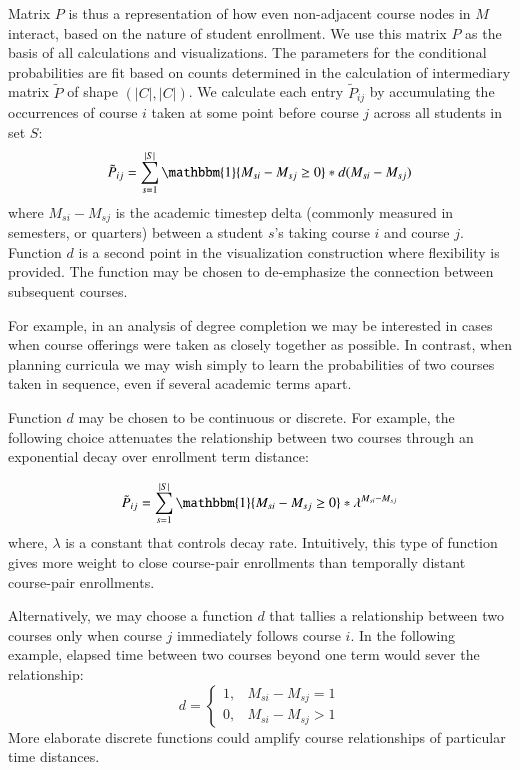 Matrix $P$ is thus a representation of how even non-adjacent course nodes in $M$ interact, based on the nature of student enrollment. We use this matrix $P$ as the basis of all calculations and visualizations. 
 The parameters for the conditional probabilities are fit based on counts determined in the calculation of intermediary matrix $\tilde{P}$ of shape $(|C|, |C|)$. We calculate each entry $\tilde{P}_{ij}$ by accumulating the occurrences of course $i$ taken at some point before course $j$ across all students in set $S$:
\begin{equation}
  \tilde{P}_{ij} = \sum_{s=1}^{|S|} \mathbbm{1}\{M_{si} - M_{sj} \geq 0\}* d(M_{si} - M_{sj})
\end{equation}
where $M_{si} - M_{sj}$ is the academic timestep delta (commonly
measured in semesters, or quarters) between a student $s$'s taking
course $i$ and course $j$. Function $d$ is a second point in the
visualization construction where flexibility is provided. The function
may be chosen to de-emphasize the connection between subsequent
courses.

For example, in an analysis of degree completion we may be interested
in cases when course offerings were taken as closely together as
possible. In contrast, when planning curricula we may wish simply to
learn the probabilities of two courses taken in sequence, even if
several academic terms apart.

Function $d$ may be chosen to be continuous or discrete.  For example,
the following choice attenuates the relationship between two courses
through an exponential decay over enrollment term distance:

\begin{equation}
  \tilde{P}_{ij} = \sum_{s=1}^{|S|} \mathbbm{1}\{M_{si} - M_{sj} \geq 0\}* \lambda^{M_{si} - M_{sj}}
\end{equation}
where, $\lambda$ is a constant that controls decay rate. Intuitively, this type of function gives more weight to close course-pair enrollments than temporally distant course-pair enrollments.

Alternatively, we may choose a function $d$ that tallies a
relationship between two courses only when course $j$ immediately
follows course $i$. In the following example, elapsed time between two
courses beyond one term would sever the relationship:
\begin{equation}
d = \begin{cases} 
      1, & M_{si} - M_{sj} = 1 \\
      0, & M_{si} - M_{sj} > 1 
    \end{cases}
\end{equation}
More elaborate discrete functions could amplify course relationships of
particular time distances.

